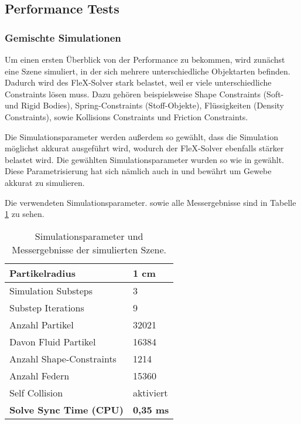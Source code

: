 \subsection{Performance Tests}
\label{subsec_perf_tests}
\subsubsection{Gemischte Simulationen}

Um einen ersten Überblick von der Performance zu bekommen, wird zunächst eine Szene simuliert, in der sich mehrere unterschiedliche Objektarten befinden. Dadurch wird des FleX-Solver stark belastet, weil er viele unterschiedliche Constraints lösen muss. Dazu gehören beispielsweise Shape Constraints (Soft- und Rigid Bodies), Spring-Constraints (Stoff-Objekte), Flüssigkeiten (Density Constraints), sowie Kollisions Constraints und Friction Constraints.



Die Simulationsparameter werden außerdem so gewählt, dass die Simulation möglichst akkurat ausgeführt wird, wodurch der FleX-Solver ebenfalls stärker belastet wird. Die gewählten Simulationsparameter wurden so wie in \cite{BreastBiopsy} gewählt. Diese Parametrisierung hat sich nämlich auch in \cite{PBDKidney} und \cite{VRSim20} bewährt um Gewebe akkurat zu simulieren.

Die verwendeten Simulationsparameter. sowie alle Messergebnisse sind in Tabelle \ref{table_mixed_sim} zu sehen.

\begin{table}[hbt!]
\centering
\caption{Simulationsparameter und Messergebnisse der simulierten Szene.}
\label{table_mixed_sim}
\begin{tabular}{l|l}
 \hline
Partikelradius & 1 cm  \\ \hline
Simulation Substeps & 3      \\ \hline
Substep Iterations & 9            \\ \hline
Anzahl Partikel & 32021            \\ \hline
Davon Fluid Partikel & 16384	\\ \hline
Anzahl Shape-Constraints & 1214		\\ \hline
Anzahl Federn & 15360 		\\ \hline
Self Collision & aktiviert \\ \hline%
\textbf{Solve Sync Time (CPU)} & \textbf{0,35 ms}
\end{tabular}
\end{table}

